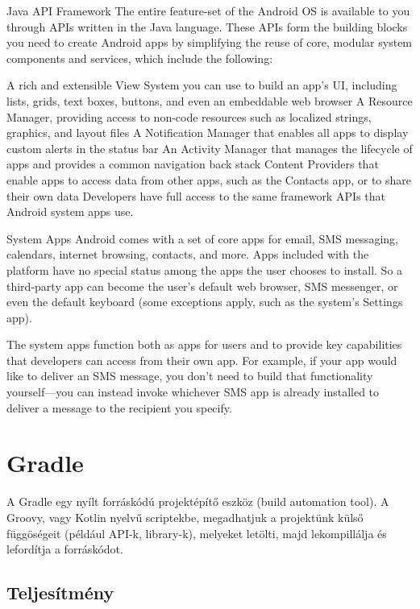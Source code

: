Java API Framework
The entire feature-set of the Android OS is available to you through APIs written in the Java language. These APIs form the building blocks you need to create Android apps by simplifying the reuse of core, modular system components and services, which include the following:

A rich and extensible View System you can use to build an app’s UI, including lists, grids, text boxes, buttons, and even an embeddable web browser
A Resource Manager, providing access to non-code resources such as localized strings, graphics, and layout files
A Notification Manager that enables all apps to display custom alerts in the status bar
An Activity Manager that manages the lifecycle of apps and provides a common navigation back stack
Content Providers that enable apps to access data from other apps, such as the Contacts app, or to share their own data
Developers have full access to the same framework APIs that Android system apps use.

System Apps
Android comes with a set of core apps for email, SMS messaging, calendars, internet browsing, contacts, and more. Apps included with the platform have no special status among the apps the user chooses to install. So a third-party app can become the user's default web browser, SMS messenger, or even the default keyboard (some exceptions apply, such as the system's Settings app).

The system apps function both as apps for users and to provide key capabilities that developers can access from their own app. For example, if your app would like to deliver an SMS message, you don't need to build that functionality yourself—you can instead invoke whichever SMS app is already installed to deliver a message to the recipient you specify.

\section{Gradle}\label{sec:ALAP:adatelem}

A Gradle egy nyílt forráskódú projektépítő eszköz (build automation tool). A Groovy, vagy Kotlin nyelvű scriptekbe, megadhatjuk a projektünk külső függöségeit (például API-k, library-k), melyeket letölti, majd lekompillálja és lefordítja a forráskódot.

\subsection{Teljesítmény}

